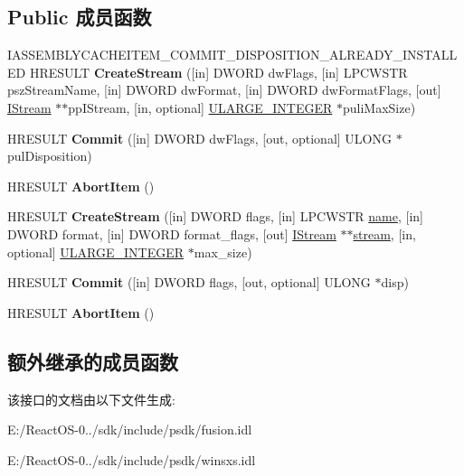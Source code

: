 \subsection*{Public 成员函数}
\begin{DoxyCompactItemize}
\item 
\mbox{\label{interface_i_assembly_cache_item_a0f65a8a82a304f6b9a813927b5c7f30d}} 
I\+A\+S\+S\+E\+M\+B\+L\+Y\+C\+A\+C\+H\+E\+I\+T\+E\+M\+\_\+\+C\+O\+M\+M\+I\+T\+\_\+\+D\+I\+S\+P\+O\+S\+I\+T\+I\+O\+N\+\_\+\+A\+L\+R\+E\+A\+D\+Y\+\_\+\+I\+N\+S\+T\+A\+L\+L\+ED H\+R\+E\+S\+U\+LT {\bfseries Create\+Stream} (\mbox{[}in\mbox{]} D\+W\+O\+RD dw\+Flags, \mbox{[}in\mbox{]} L\+P\+C\+W\+S\+TR psz\+Stream\+Name, \mbox{[}in\mbox{]} D\+W\+O\+RD dw\+Format, \mbox{[}in\mbox{]} D\+W\+O\+RD dw\+Format\+Flags, \mbox{[}out\mbox{]} \hyperlink{interface_i_stream}{I\+Stream} $\ast$$\ast$pp\+I\+Stream, \mbox{[}in, optional\mbox{]} \hyperlink{struct___u_l_a_r_g_e___i_n_t_e_g_e_r}{U\+L\+A\+R\+G\+E\+\_\+\+I\+N\+T\+E\+G\+ER} $\ast$puli\+Max\+Size)
\item 
\mbox{\label{interface_i_assembly_cache_item_a4b2a8ba3d04793c202aad38a685f1aa2}} 
H\+R\+E\+S\+U\+LT {\bfseries Commit} (\mbox{[}in\mbox{]} D\+W\+O\+RD dw\+Flags, \mbox{[}out, optional\mbox{]} U\+L\+O\+NG $\ast$pul\+Disposition)
\item 
\mbox{\label{interface_i_assembly_cache_item_ab8c72d62a9274c8fe7c8eab00f58a028}} 
H\+R\+E\+S\+U\+LT {\bfseries Abort\+Item} ()
\item 
\mbox{\label{interface_i_assembly_cache_item_a285c3e88550f76cf612cf544deaf8ec0}} 
H\+R\+E\+S\+U\+LT {\bfseries Create\+Stream} (\mbox{[}in\mbox{]} D\+W\+O\+RD flags, \mbox{[}in\mbox{]} L\+P\+C\+W\+S\+TR \hyperlink{structname}{name}, \mbox{[}in\mbox{]} D\+W\+O\+RD format, \mbox{[}in\mbox{]} D\+W\+O\+RD format\+\_\+flags, \mbox{[}out\mbox{]} \hyperlink{interface_i_stream}{I\+Stream} $\ast$$\ast$\hyperlink{structstream}{stream}, \mbox{[}in, optional\mbox{]} \hyperlink{struct___u_l_a_r_g_e___i_n_t_e_g_e_r}{U\+L\+A\+R\+G\+E\+\_\+\+I\+N\+T\+E\+G\+ER} $\ast$max\+\_\+size)
\item 
\mbox{\label{interface_i_assembly_cache_item_a4e2d889b0fcab73005daee8d05a445df}} 
H\+R\+E\+S\+U\+LT {\bfseries Commit} (\mbox{[}in\mbox{]} D\+W\+O\+RD flags, \mbox{[}out, optional\mbox{]} U\+L\+O\+NG $\ast$disp)
\item 
\mbox{\label{interface_i_assembly_cache_item_ab8c72d62a9274c8fe7c8eab00f58a028}} 
H\+R\+E\+S\+U\+LT {\bfseries Abort\+Item} ()
\end{DoxyCompactItemize}
\subsection*{额外继承的成员函数}


该接口的文档由以下文件生成\+:\begin{DoxyCompactItemize}
\item 
E\+:/\+React\+O\+S-\/0../sdk/include/psdk/fusion.\+idl\item 
E\+:/\+React\+O\+S-\/0../sdk/include/psdk/winsxs.\+idl\end{DoxyCompactItemize}
